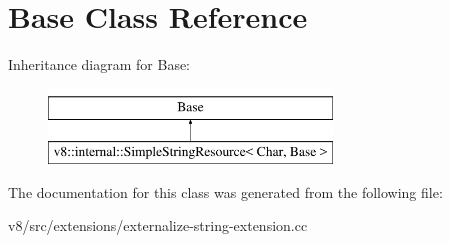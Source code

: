 \hypertarget{classBase}{}\section{Base Class Reference}
\label{classBase}
Inheritance diagram for Base\+:\begin{figure}[H]
\begin{center}
\leavevmode
\includegraphics[height=2.000000cm]{classBase}
\end{center}
\end{figure}


The documentation for this class was generated from the following file\+:\begin{DoxyCompactItemize}
\item 
v8/src/extensions/externalize-\/string-\/extension.\+cc\end{DoxyCompactItemize}
